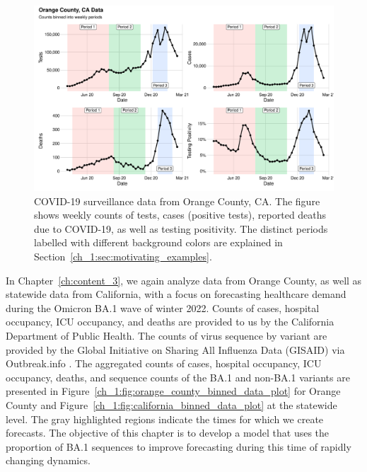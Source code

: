 \begin{figure}
    \centering
    \includegraphics[width=1.0\columnwidth]{binned_data_plot}
    \caption[COVID-19 surveillance data from Orange County, CA.]{
    COVID-19 surveillance data from Orange County, CA.
    The figure shows weekly counts of tests, cases (positive tests), reported deaths due to COVID-19, as well as testing positivity.
    The distinct periods labelled with different background colors are explained in Section~\ref{ch_1:sec:motivating_examples}.}
    \label{ch_1:fig:binned_data_plot}
\end{figure}

In Chapter~\ref{ch:content_3}, we again analyze data from Orange County, as well as statewide data from California, with a focus on forecasting healthcare demand during the Omicron BA.1 wave of winter 2022. 
Counts of cases, hospital occupancy, ICU occupancy, and deaths are provided to us by the California Department of Public Health.
The counts of virus sequence by variant are provided by the Global Initiative on Sharing All Influenza Data (GISAID) \citep{shu2017gisaid} via Outbreak.info \citep{Gangavarapu2023}.
The aggregated counts of cases, hospital occupancy, ICU occupancy, deaths, and sequence counts of the BA.1 and non-BA.1 variants are presented in Figure~\ref{ch_1:fig:orange_county_binned_data_plot} for Orange County and Figure~\ref{ch_1:fig:california_binned_data_plot} at the statewide level.
The gray highlighted regions indicate the times for which we create forecasts.
The objective of this chapter is to develop a model that uses the proportion of BA.1 sequences to improve forecasting during this time of rapidly changing dynamics.

